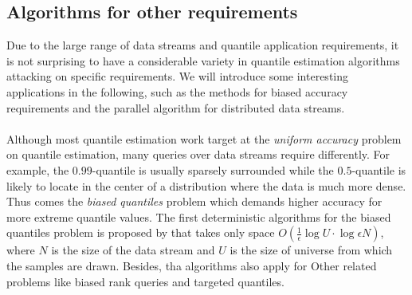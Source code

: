 \subsection{Algorithms for other requirements}
\label{other}
Due to the large range of data streams and quantile application requirements, it is not surprising to have a considerable variety in quantile estimation algorithms attacking on specific requirements. We will introduce some interesting applications in the following, such as the methods for biased accuracy requirements and the parallel algorithm for distributed data streams.
\\\\
Although most quantile estimation work target at the \textit{uniform accuracy} problem on quantile estimation, many queries over data streams require differently. For example, the $0.99$-quantile is usually sparsely surrounded while the $0.5$-quantile is likely to locate in the center of a distribution where the data is much more dense. Thus comes the \textit{biased quantiles} problem which demands higher accuracy for more extreme quantile values.
The first deterministic algorithms for the biased quantiles problem is proposed by \citeauthor{cormodeSpaceTimeefficientDeterministic2006} \cite{cormodeSpaceTimeefficientDeterministic2006} that takes only space $O(\frac{1}{\epsilon} \log {U} \cdot \log {\epsilon N})$, where $N$ is the size of the data stream and $U$ is the size of universe from which the samples are drawn. Besides, tha algorithms also apply for Other related problems like biased rank queries and targeted quantiles. 



